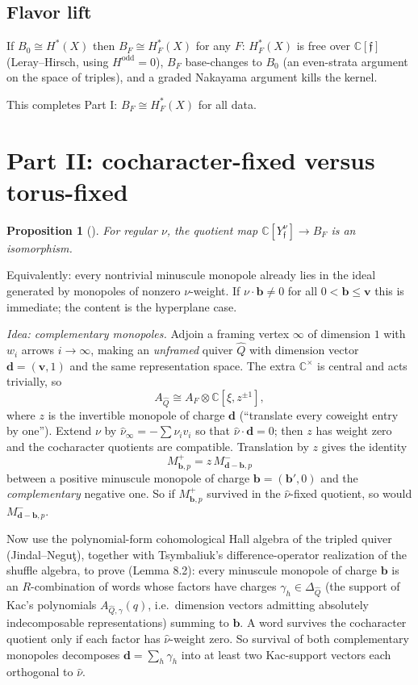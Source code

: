\documentclass[11pt]{amsart}
\newtheorem{proposition}[theorem]{Proposition}
\theoremstyle{remark}
\newcommand{\C}{\mathbb{C}}
\newcommand{\bv}{\mathbf{v}}
\newcommand{\bb}{\mathbf{b}}
\newcommand{\bd}{\mathbf{d}}
\newcommand{\Hc}{H^*_F(X)}
\begin{document}
\subsection{Flavor lift}  If $B_0\cong H^*(X)$ then $B_F\cong\Hc$ for any
$F$: $\Hc$ is free over $\C[\mathfrak f]$ (Leray--Hirsch, using
$H^{\mathrm{odd}}=0$), $B_F$ base-changes to $B_0$ (an even-strata
argument on the space of triples), and a graded Nakayama argument kills
the kernel.

\medskip
This completes Part I: $B_F\cong\Hc$ for all data.

\section{Part II: cocharacter-fixed versus torus-fixed}

\begin{proposition}[{\cite[Prop.~8.4]{OAI-Hikita}}]
For regular $\nu$, the quotient map $\C[Y_{\mathfrak f}^\nu]\to B_F$ is an
isomorphism.
\end{proposition}
Equivalently: every nontrivial minuscule monopole already lies in the ideal
generated by monopoles of nonzero $\nu$-weight.  If $\nu\cdot\bb\neq0$ for all
$0<\bb\le\bv$ this is immediate; the content is the hyperplane case.

\noindent\emph{Idea: complementary monopoles.}  Adjoin a framing vertex
$\infty$ of dimension $1$ with $w_i$ arrows $i\to\infty$, making an
\emph{unframed} quiver $\widehat Q$ with dimension vector $\bd=(\bv,1)$ and
the same representation space.  The extra $\C^\times$ is central and acts
trivially, so
\[
 A_{\widehat Q}\cong A_F\otimes\C[\xi,z^{\pm1}],
\]
where $z$ is the invertible monopole of charge $\bd$ (``translate every
coweight entry by one'').  Extend $\nu$ by $\widehat\nu_\infty=-\sum\nu_iv_i$
so that $\widehat\nu\cdot\bd=0$; then $z$ has weight zero and the cocharacter
quotients are compatible.  Translation by $z$ gives the identity
\[
 M^+_{\bb,p}=z\,M^-_{\bd-\bb,p}
\]
between a positive minuscule monopole of charge $\bb=(\bb',0)$ and the
\emph{complementary} negative one.  So if $M^+_{\bb,p}$ survived in the
$\widehat\nu$-fixed quotient, so would $M^-_{\bd-\bb,p}$.

Now use the polynomial-form cohomological Hall algebra of the tripled
quiver (Jindal--Negu\c t), together with Tsymbaliuk's difference-operator
realization of the shuffle algebra, to prove (Lemma 8.2): every minuscule
monopole of charge $\bb$ is an $R$-combination of words whose factors have
charges $\gamma_h\in\Delta_{\widehat Q}$ (the support of Kac's polynomials
$A_{\widehat Q,\gamma}(q)$, i.e.\ dimension vectors admitting absolutely
indecomposable representations) summing to $\bb$.  A word survives the
cocharacter quotient only if each factor has $\widehat\nu$-weight zero.  So
survival of both complementary monopoles decomposes $\bd=\sum_h\gamma_h$
into at least two Kac-support vectors each orthogonal to $\widehat\nu$.
\end{document}
